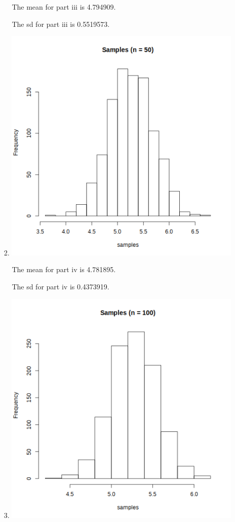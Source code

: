 \documentclass[12pt,letterpaper]{article}
\begin{document}
\begin{enumerate}
\begin{enumerate}
\begin{enumerate}
              The mean for part iii is \num{4.794909}.

              The sd for part iii is \num{0.5519573}.
            \item
              \includegraphics[width=\linewidth]{prob3a_iv.png}

              The mean for part iv is \num{4.781895}.

              The sd for part iv is \num{0.4373919}.
            \item
              \includegraphics[width=\linewidth]{prob3a_v.png}


\end{enumerate}
\end{enumerate}
\end{enumerate}
\end{document}
